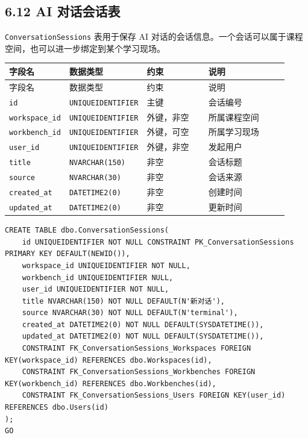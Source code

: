 \documentclass[10pt,a4paper,fontset=none]{ctexart}
\begin{document}
\subsection*{6.12 AI 对话会话表}

\texttt{ConversationSessions} 表用于保存 AI 对话的会话信息。一个会话可以属于课程空间，也可以进一步绑定到某个学习现场。\par

\begingroup\scriptsize
\renewcommand{\arraystretch}{1.18}
\setlength{\LTleft}{0pt}
\setlength{\LTright}{0pt}
\begin{longtable}{>{\raggedright\arraybackslash}p{0.20\linewidth}>{\raggedright\arraybackslash}p{0.16\linewidth}>{\raggedright\arraybackslash}p{0.24\linewidth}>{\raggedright\arraybackslash}p{0.32\linewidth}}
\toprule
字段名 & 数据类型 & 约束 & 说明 \\
\midrule
\endfirsthead
\toprule
字段名 & 数据类型 & 约束 & 说明 \\
\midrule
\endhead
\texttt{id} & \texttt{UNIQUEIDENTIFIER} & 主键 & 会话编号 \\
\texttt{workspace\_id} & \texttt{UNIQUEIDENTIFIER} & 外键，非空 & 所属课程空间 \\
\texttt{workbench\_id} & \texttt{UNIQUEIDENTIFIER} & 外键，可空 & 所属学习现场 \\
\texttt{user\_id} & \texttt{UNIQUEIDENTIFIER} & 外键，非空 & 发起用户 \\
\texttt{title} & \texttt{NVARCHAR(150)} & 非空 & 会话标题 \\
\texttt{source} & \texttt{NVARCHAR(30)} & 非空 & 会话来源 \\
\texttt{created\_at} & \texttt{DATETIME2(0)} & 非空 & 创建时间 \\
\texttt{updated\_at} & \texttt{DATETIME2(0)} & 非空 & 更新时间 \\
\bottomrule
\end{longtable}
\endgroup


\begin{Verbatim}[fontsize=\scriptsize,frame=single]
CREATE TABLE dbo.ConversationSessions(
    id UNIQUEIDENTIFIER NOT NULL CONSTRAINT PK_ConversationSessions PRIMARY KEY DEFAULT(NEWID()),
    workspace_id UNIQUEIDENTIFIER NOT NULL,
    workbench_id UNIQUEIDENTIFIER NULL,
    user_id UNIQUEIDENTIFIER NOT NULL,
    title NVARCHAR(150) NOT NULL DEFAULT(N'新对话'),
    source NVARCHAR(30) NOT NULL DEFAULT(N'terminal'),
    created_at DATETIME2(0) NOT NULL DEFAULT(SYSDATETIME()),
    updated_at DATETIME2(0) NOT NULL DEFAULT(SYSDATETIME()),
    CONSTRAINT FK_ConversationSessions_Workspaces FOREIGN KEY(workspace_id) REFERENCES dbo.Workspaces(id),
    CONSTRAINT FK_ConversationSessions_Workbenches FOREIGN KEY(workbench_id) REFERENCES dbo.Workbenches(id),
    CONSTRAINT FK_ConversationSessions_Users FOREIGN KEY(user_id) REFERENCES dbo.Users(id)
);
GO
\end{Verbatim}
\end{document}
